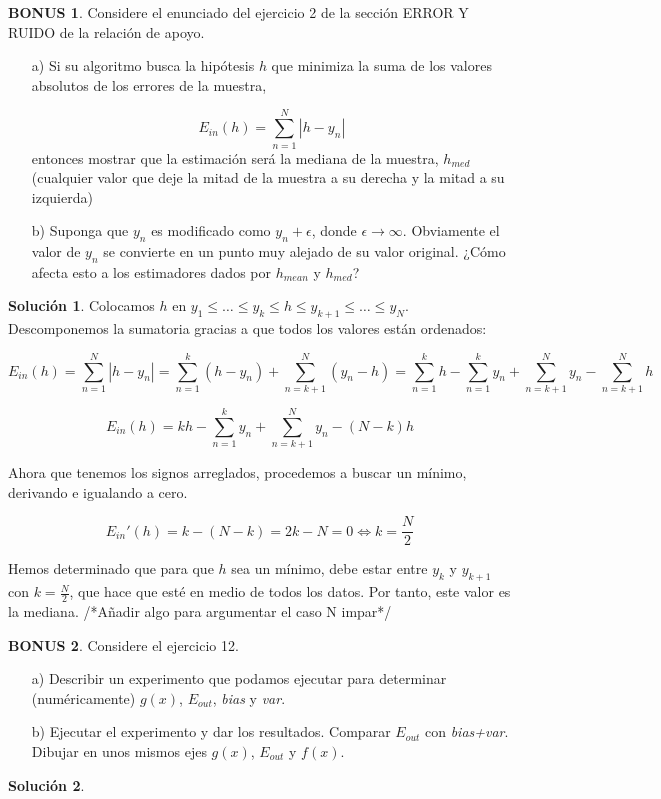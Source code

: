 \documentclass[a4paper, 11pt]{article}
\theoremstyle{definition}
\newtheorem*{solucion}{Solución}
\newtheorem*{bonus}{BONUS}
\begin{document}
  \begin{bonus}
    Considere el enunciado del ejercicio 2 de la sección ERROR Y RUIDO de la relación de apoyo.
    \begin{itemize}
      \item[a)] Si su algoritmo busca la hipótesis $h$ que minimiza la suma de los valores absolutos de los errores de la muestra,

      \[
      E_{in}(h) = \sum_{n=1}^N{|h-y_n|}
      \]
      entonces mostrar que la estimación será la mediana de la muestra, $h_{med}$ (cualquier valor que deje la mitad de la muestra a su derecha y la mitad a su izquierda)

      \item[b)] Suponga que $y_n$ es modificado como $y_n + \epsilon$, donde $\epsilon \rightarrow \infty$. Obviamente el valor de $y_n$ se convierte en un punto muy alejado de su valor original. ¿Cómo afecta esto a los estimadores dados por $h_{mean}$ y $h_{med}$?
    \end{itemize}
  \end{bonus}

  \begin{solucion}
    Colocamos $h$ en $y_1 \leq \ldots \leq y_k \leq h \leq y_{k+1} \leq \ldots \leq y_N$. Descomponemos la sumatoria gracias a que todos los valores están ordenados:

    $$E_{in}(h) = \sum_{n=1}^N{|h-y_n|} = \sum_{n=1}^k{(h-y_n)} + \sum_{n=k+1}^N{(y_n-h)} = \sum_{n=1}^k{h}-\sum_{n=1}^k{y_n} + \sum_{n=k+1}^N{y_n}-\sum_{n=k+1}^N{h}$$

    $$E_{in}(h)= kh-\sum_{n=1}^k{y_n} + \sum_{n=k+1}^N{y_n}-(N-k)h$$

    Ahora que tenemos los signos arreglados, procedemos a buscar un mínimo, derivando e igualando a cero.

    $$E_{in}'(h) = k - (N - k) = 2k - N = 0 \Leftrightarrow k = \frac{N}{2}$$

    Hemos determinado que para que $h$ sea un mínimo, debe estar entre $y_k$ y $y_{k+1}$ con $k=\frac{N}{2}$, que hace que esté en medio de todos los datos. Por tanto, este valor es la mediana. /*Añadir algo para argumentar el caso N impar*/


  \end{solucion}

  \begin{bonus}
    Considere el ejercicio 12.
    \begin{itemize}
      \item[a)] Describir un experimento que podamos ejecutar para determinar (numéricamente) $g(x)$, $E_{out}$, \emph{bias} y \emph{var}.

      \item[b)] Ejecutar el experimento y dar los resultados. Comparar $E_{out}$ con \emph{bias+var}. Dibujar en unos mismos ejes $g(x)$, $E_{out}$ y $f(x)$.
    \end{itemize}
  \end{bonus}

  \begin{solucion}

  \end{solucion}
\end{document}
